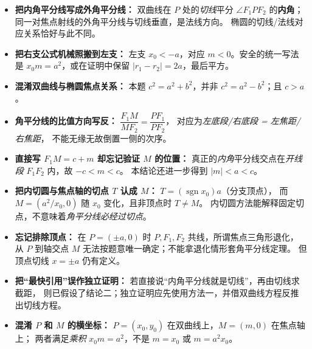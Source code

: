 \begin{trapbox}
\begin{itemize}
\item \textbf{把内角平分线写成外角平分线：}
双曲线在 $P$ 处的\emph{切线}平分 $\angle F_1PF_2$ 的\textbf{内角}；
同一对焦点射线的外角平分线与切线垂直，是法线方向。
椭圆的切线/法线对应关系恰好与此不同。

\item \textbf{把右支公式机械照搬到左支：}
左支 $x_0<-a$，对应 $m<0$。安全的统一写法是
$\boxed{x_0m=a^2}$，或在证明中保留 $|r_1-r_2|=2a$，最后平方。

\item \textbf{混淆双曲线与椭圆焦点关系：}
本题 $c^2=a^2+b^2$，并非 $c^2=a^2-b^2$；且 $c>a$。

\item \textbf{角平分线的比值方向写反：}
$\dfrac{F_1M}{MF_2}=\dfrac{PF_1}{PF_2}$，
对应为\emph{左底段/右底段 = 左焦距/右焦距}，
不能无缘无故倒置一侧的次序。

\item \textbf{直接写 $F_1M=c+m$ 却忘记验证 $M$ 的位置：}
真正的\emph{内角}平分线交点在\emph{开线段} $F_1F_2$ 内，故 $-c<m<c$。
本结论还进一步得到 $|m|<a<c$。

\item \textbf{把内切圆与焦点轴的切点 $T$ 认成 $M$：}
$T=(\operatorname{sgn}x_0)a$（分支顶点），
而 $M=(a^2/x_0,0)$ 随 $x_0$ 变化，且非顶点时 $T\ne M$。
内切圆方法能解释固定切点，不意味着\emph{角平分线必经过切点}。

\item \textbf{忘记排除顶点：}
在 $P=(\pm a,0)$ 时 $P,F_1,F_2$ 共线，所谓焦点三角形退化，
从 $P$ 到轴交点 $M$ 无法按题意唯一确定；不能拿退化情形套角平分线定理。
但顶点切线 $x=\pm a$ 仍有定义。

\item \textbf{把“最快引用”误作独立证明：}
若直接说“内角平分线就是切线”，再由切线求截距，
则已假设了结论二；独立证明应先使用方法一，并借双曲线方程反推出切线方程。

\item \textbf{混淆 $P$ 和 $M$ 的横坐标：}
$P=(x_0,y_0)$ 在双曲线上，$M=(m,0)$ 在焦点轴上；
两者满足\emph{乘积} $x_0m=a^2$，不是 $m=x_0$ 或 $m=a^2x_0$。
\end{itemize}
\end{trapbox}
